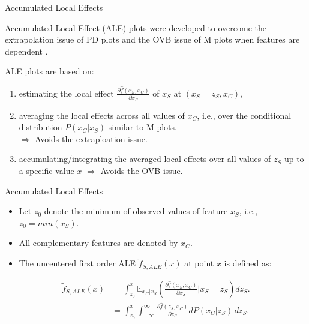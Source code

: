 \documentclass[aspectratio=169]{../latex_main/tntbeamer}  %
\begin{document}
\begin{frame}{Accumulated Local Effects}

Accumulated Local Effect (ALE) plots were developed to overcome the extrapolation issue of PD plots and the OVB issue of M plots when features are dependent .

\pause
\medskip
ALE plots are based on:
\begin{enumerate}
\item estimating the local effect $\frac{\partial \hat{f}(x_S, x_C)}{\partial x_S}$ of $x_S$ at $(x_S = z_S, x_C)$,
\pause
\item averaging the local effects across all values of $x_C$, i.e., over the conditional distribution $P(x_C|x_S)$ similar to M plots.\\
$\Rightarrow$ Avoids the extraploation issue.
\pause
\item accumulating/integrating the averaged local effects over all values of $z_S$ up to a specific value $x$ $\Rightarrow$ Avoids the OVB issue.
\end{enumerate}

\end{frame}


\begin{frame}{Accumulated Local Effects}

\begin{itemize}
    \item Let $z_0$ denote the minimum of observed values of feature $x_S$, i.e., $z_0 = min(x_S)$.
    \item All complementary features are denoted by $x_C$.
    \item The uncentered first order ALE $\tilde{f}_{S, ALE}(x)$ at point $x$ is defined as:
\end{itemize}

$$
\begin{aligned}
\tilde{f}_{S, ALE}(x) &= \int_{z_{0}}^{x} \mathbb{E}_{x_C \vert x_S} \left(\frac{\partial \hat{f}(x_S, x_C)}{\partial x_S} \bigg \vert x_S = z_S \right) dz_S. \\
&= \int_{z_{0}}^{x} \int_{-\infty}^{\infty}  \frac{\partial \hat{f}(z_S, x_C)}{\partial z_S} d P(x_C | z_S) \, dz_S.
\end{aligned}
$$

\end{frame}
\end{document}
